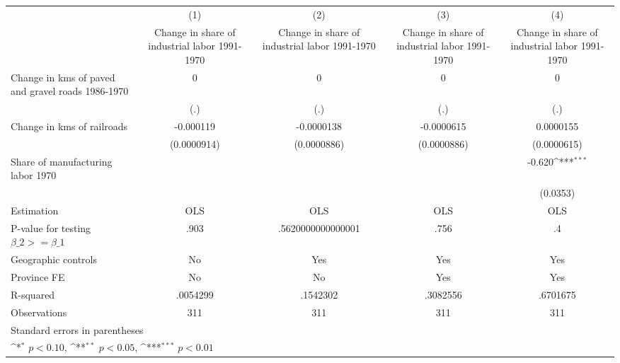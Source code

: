 {
\def\sym#1{\ifmmode^{#1}\else\(^{#1}\)\fi}
\begin{tabular}{l*{4}{c}}
\hline\hline
                    &\multicolumn{1}{c}{(1)}&\multicolumn{1}{c}{(2)}&\multicolumn{1}{c}{(3)}&\multicolumn{1}{c}{(4)}\\
                    &\multicolumn{1}{c}{Change in share of industrial labor 1991-1970}&\multicolumn{1}{c}{Change in share of industrial labor 1991-1970}&\multicolumn{1}{c}{Change in share of industrial labor 1991-1970}&\multicolumn{1}{c}{Change in share of industrial labor 1991-1970}\\
\hline
Change in kms of paved and gravel roads 1986-1970&           0         &           0         &           0         &           0         \\
                    &         (.)         &         (.)         &         (.)         &         (.)         \\
[1em]
Change in kms of railroads&   -0.000119         &  -0.0000138         &  -0.0000615         &   0.0000155         \\
                    & (0.0000914)         & (0.0000886)         & (0.0000886)         & (0.0000615)         \\
[1em]
Share of manufacturing labor 1970&                     &                     &                     &      -0.620\sym{***}\\
                    &                     &                     &                     &    (0.0353)         \\
\hline
Estimation          &         OLS         &         OLS         &         OLS         &         OLS         \\
P-value for testing $\beta\_2 >= \beta\_1$&        .903         &.5620000000000001         &        .756         &          .4         \\
Geographic controls &          No         &         Yes         &         Yes         &         Yes         \\
Province FE         &          No         &          No         &         Yes         &         Yes         \\
R-squared           &    .0054299         &    .1542302         &    .3082556         &    .6701675         \\
Observations        &         311         &         311         &         311         &         311         \\
\hline\hline
\multicolumn{5}{l}{\footnotesize Standard errors in parentheses}\\
\multicolumn{5}{l}{\footnotesize \sym{*} \(p<0.10\), \sym{**} \(p<0.05\), \sym{***} \(p<0.01\)}\\
\end{tabular}
}
